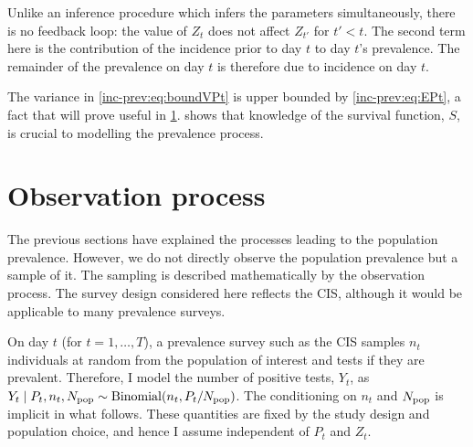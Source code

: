 \documentclass[thesis.tex]{subfiles}
\begin{document}
Unlike an inference procedure which infers the parameters simultaneously, there is no feedback loop: the value of $Z_{t}$ does not affect $Z_{t'}$ for $t' < t$.
The second term here is the contribution of the incidence prior to day $t$ to day $t$'s prevalence.
The remainder of the prevalence on day $t$ is therefore due to incidence on day $t$.

The variance in \cref{inc-prev:eq:boundVPt} is upper bounded by \cref{inc-prev:eq:EPt}, a fact that will prove useful in \cref{inc-prev:sec:observation-process}.
 shows that knowledge of the survival function, $S$, is crucial to modelling the prevalence process.

\section{Observation process} \label{inc-prev:sec:observation-process}

The previous sections have explained the processes leading to the population prevalence.
However, we do not directly observe the population prevalence but a sample of it.
The sampling is described mathematically by the observation process.
The survey design considered here reflects the CIS, although it would be applicable to many prevalence surveys.

On day $t$ (for $t = 1, \dots, T$), a prevalence survey such as the CIS samples $n_t$ individuals at random from the population of interest and tests if they are prevalent.
Therefore, I model the number of positive tests, $Y_t$, as $Y_t \mid P_t, n_t, N_\text{pop} \sim \operatorname{Binomial}(n_t, P_t/N_\text{pop})$.
The conditioning on $n_t$ and $N_\text{pop}$ is implicit in what follows.
These quantities are fixed by the study design and population choice, and hence I assume independent of $P_t$ and $Z_t$.
\end{document}
